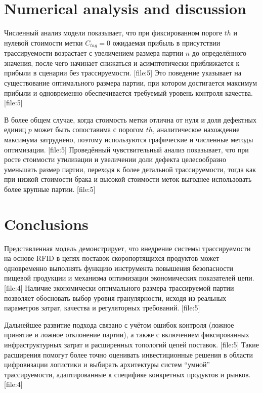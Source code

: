 \documentclass[eng]{ajceam-class}
\begin{document}
\section{Numerical analysis and discussion}

Численный анализ модели показывает, что при фиксированном пороге $th$ и нулевой стоимости метки $C_{tag}=0$ ожидаемая прибыль в присутствии трассируемости возрастает с увеличением размера партии $n$ до определённого значения, после чего начинает снижаться и асимптотически приближается к прибыли в сценарии без трассируемости. [file:5] Это поведение указывает на существование оптимального размера партии, при котором достигается максимум прибыли и одновременно обеспечивается требуемый уровень контроля качества. [file:5]

В более общем случае, когда стоимость метки отлична от нуля и доля дефектных единиц $p$ может быть сопоставима с порогом $th$, аналитическое нахождение максимума затруднено, поэтому используются графические и численные методы оптимизации. [file:5] Проведённый чувствительный анализ показывает, что при росте стоимости утилизации и увеличении доли дефекта целесообразно уменьшать размер партии, переходя к более детальной трассируемости, тогда как при низкой стоимости брака и высокой стоимости меток выгоднее использовать более крупные партии. [file:5]

\section{Conclusions}

Представленная модель демонстрирует, что внедрение системы трассируемости на основе RFID в цепях поставок скоропортящихся продуктов может одновременно выполнять функцию инструмента повышения безопасности пищевой продукции и механизма оптимизации экономических показателей цепи. [file:4] Наличие экономически оптимального размера трассируемой партии позволяет обосновать выбор уровня гранулярности, исходя из реальных параметров затрат, качества и регуляторных требований. [file:5]

Дальнейшее развитие подхода связано с учётом ошибок контроля (ложное принятие и ложное отклонение партии), а также с включением фиксированных инфраструктурных затрат и расширенных топологий цепей поставок. [file:5] Такие расширения помогут более точно оценивать инвестиционные решения в области цифровизации логистики и выбирать архитектуры систем ``умной'' трассируемости, адаптированные к специфике конкретных продуктов и рынков. [file:4]
\end{document}
